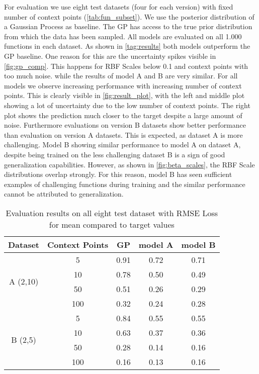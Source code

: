 For evaluation we use eight test datasets (four for each version) with fixed number of context points (\autoref{tab:fun_subset}). We use the posterior distribution of a Gaussian Process as baseline. The GP has access to the true prior distribution from which the data has been sampled. All models are evaluated on all 1.000 functions in each dataset.
As shown in \autoref{tag:results} both models outperform the GP baseline. One reason for this are the uncertainty spikes visible in \autoref{fig:gp_comp}. This happens for RBF Scales below 0.1 and context points with too much noise. while the results of model A and B are very similar. For all models we observe increasing performance with increasing number of context points. This is clearly visible in \autoref{fig:result_plot}, with the left and middle plot showing a lot of uncertainty due to the low number of context points. The right plot shows the prediction much closer to the target despite a large amount of noise. Furthermore evaluations on version B datasets show better performance than evaluation on version A datasets. This is expected, as dataset A is more challenging. Model B showing similar performance to model A on dataset A, despite being trained on the less challenging dataset B is a sign of good generalization capabilities. However, as shown in \autoref{fig:beta_scales}, the RBF Scale distributions overlap strongly. For this reason, model B has seen sufficient examples of challenging functions during training and the similar performance cannot be attributed to generalization.

	\begin{table}[]
	\caption{Evaluation results on all eight test dataset with RMSE Loss for mean compared to target values}
	\begin{tabular}{c c c c c}
		\toprule
		Dataset & Context Points & GP & model A & model B\\
		\midrule
		\multirow{4}{*}{A (2,10)} & 5 & 0.91 & 0.72 & 0.71\\
		&10& 0.78 & 0.50 & 0.49\\ 
		&50 & 0.51 & 0.26 & 0.29\\
		&100 & 0.32 & 0.24 & 0.28\\\midrule
		\multirow{4}{*}{B (2,5)} & 5 & 0.84 & 0.55 & 0.55\\
		& 10 & 0.63 & 0.37 & 0.36\\
		& 50 & 0.28 & 0.14 & 0.16\\
		& 100 & 0.16 & 0.13 & 0.16\\\bottomrule
	\end{tabular}
\label{tag:results}
\end{table}

